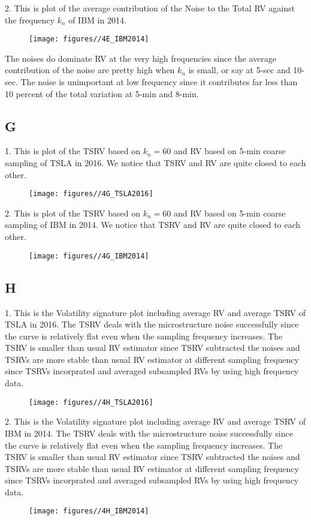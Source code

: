 \documentclass{report}
\begin{document}
2. This is plot of the average contribution of the Noise to the Total RV against the frequency $k_{n}$ of IBM in 2014.
\begin{figure}[H]
        \centering 
         \texttt{[image: figures//4E\_IBM2014]}
\end{figure}
The noises do dominate RV at the very high frequencies since the average contribution of the noise are pretty high when $k_{n}$ is small, or say at 5-sec and 10-sec. The noise is unimportant at low frequency since it contributes far less than 10 percent of the total variation at 5-min and 8-min.

\subsection{G}
1. This is plot of the TSRV based on $ k_{n} = 60 $ and RV based on 5-min coarse sampling of TSLA in 2016. We notice that TSRV and RV are quite closed to each other.
\begin{figure}[H]
        \centering 
         \texttt{[image: figures//4G\_TSLA2016]}
\end{figure}

2. This is plot of the TSRV based on $ k_{n} = 60 $ and RV based on 5-min coarse sampling of IBM in 2014. We notice that TSRV and RV are quite closed to each other.
\begin{figure}[H]
        \centering 
         \texttt{[image: figures//4G\_IBM2014]}
\end{figure}

\subsection{H}
1. This is the Volatility signature plot including average RV and average TSRV of TSLA in 2016. The TSRV deals with the microstructure noise successfully since the curve is relatively flat even when the sampling frequency increases. The TSRV is smaller than usual RV estimator since TSRV subtracted the noises and TSRVs are more stable than usual RV estimator at different sampling frequency since TSRVs incorprated and averaged subsampled RVs by using high frequency data.
\begin{figure}[H]
        \centering 
         \texttt{[image: figures//4H\_TSLA2016]}
\end{figure}

2. This is the Volatility signature plot including average RV and average TSRV of IBM in 2014. The TSRV deals with the microstructure noise successfully since the curve is relatively flat even when the sampling frequency increases. The TSRV is smaller than usual RV estimator since TSRV subtracted the noises and TSRVs are more stable than usual RV estimator at different sampling frequency since TSRVs incorprated and averaged subsampled RVs by using high frequency data.
\begin{figure}[H]
        \centering 
         \texttt{[image: figures//4H\_IBM2014]}
\end{figure}
\end{document}
